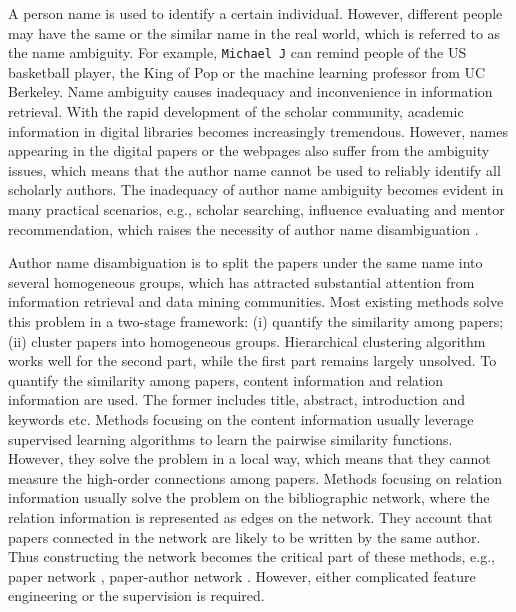 \documentclass[letterpaper]{article} %
\begin{document}
A person name is used to identify a certain individual. 
However, different people may have the same or the similar name in the real world, which is referred to as the name ambiguity.  
For example, \texttt{Michael J} can remind people of the US basketball player, the King of Pop or the machine learning professor from UC Berkeley. 
Name ambiguity causes inadequacy and inconvenience in information retrieval. 
With the rapid development of the scholar community, academic information in digital libraries becomes increasingly tremendous.
However, names appearing in the digital papers or the webpages also suffer from the ambiguity issues, which means that the author name cannot be used to reliably identify all scholarly authors.
The inadequacy of author name ambiguity becomes evident in many practical scenarios, e.g., scholar searching, influence evaluating and mentor recommendation, which raises the necessity of author name disambiguation \cite{smalheiser2009author}.

Author name disambiguation is to split the papers under the same name into several homogeneous groups, 
which has attracted substantial attention from information retrieval and data mining communities. 
Most existing methods solve this problem in a two-stage framework: 
(i) quantify the similarity among papers; 
(ii) cluster papers into homogeneous groups. 
Hierarchical clustering algorithm works well for the second part, while the first part remains largely unsolved.
To quantify the similarity among papers, content information and relation information are used. 
The former includes title, abstract, introduction and keywords etc.   
Methods focusing on the content information \cite{han:2014,Huang:2006,Yoshida:2010} usually leverage supervised learning algorithms to learn the pairwise similarity functions. 
However, they solve the problem in a local way, which means that they cannot measure the high-order connections among papers.
Methods focusing on relation information \cite{Kanani:2007,Bekkerman:2005} usually solve the problem on the bibliographic network, where the relation information is represented as edges on the network.
They account that papers connected in the network are likely to be written by the same author.
Thus constructing the network becomes the critical part of these methods, e.g., paper network \cite{JieTang}, paper-author network \cite{Anonymized}.
However, either complicated feature engineering or the supervision \cite{JieTang} is required. 
\end{document}
